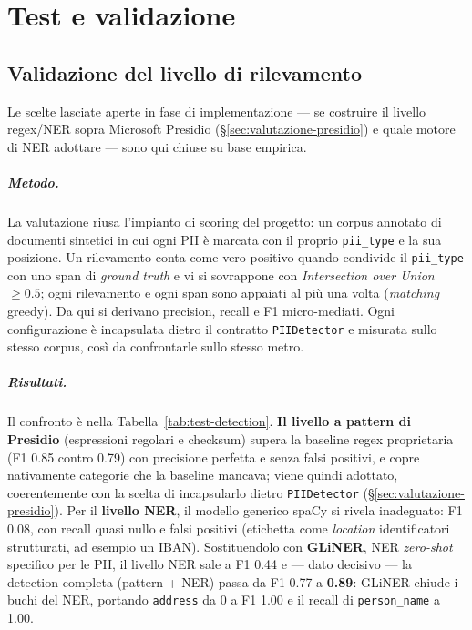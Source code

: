 \chapter{Test e validazione}
\label{cap:test}

\section{Validazione del livello di rilevamento}
\label{sec:test-detection}

Le scelte lasciate aperte in fase di implementazione --- se costruire il livello regex/NER sopra Microsoft Presidio (§\ref{sec:valutazione-presidio}) e quale motore di NER adottare --- sono qui chiuse su base empirica.

\paragraph{Metodo.} La valutazione riusa l'impianto di scoring del progetto: un corpus annotato di documenti sintetici in cui ogni PII è marcata con il proprio \texttt{pii\_type} e la sua posizione. Un rilevamento conta come vero positivo quando condivide il \texttt{pii\_type} con uno span di \textit{ground truth} e vi si sovrappone con \textit{Intersection over Union} $\geq 0.5$; ogni rilevamento e ogni span sono appaiati al più una volta (\textit{matching} greedy). Da qui si derivano precision, recall e F1 micro-mediati. Ogni configurazione è incapsulata dietro il contratto \texttt{PIIDetector} e misurata sullo stesso corpus, così da confrontarle sullo stesso metro.

\paragraph{Risultati.} Il confronto è nella Tabella~\ref{tab:test-detection}. \textbf{Il livello a pattern di Presidio} (espressioni regolari e checksum) supera la baseline regex proprietaria (F1 0.85 contro 0.79) con precisione perfetta e senza falsi positivi, e copre nativamente categorie che la baseline mancava; viene quindi adottato, coerentemente con la scelta di incapsularlo dietro \texttt{PIIDetector} (§\ref{sec:valutazione-presidio}). Per il \textbf{livello NER}, il modello generico spaCy si rivela inadeguato: F1 0.08, con recall quasi nullo e falsi positivi (etichetta come \textit{location} identificatori strutturati, ad esempio un IBAN). Sostituendolo con \textbf{GLiNER}, NER \textit{zero-shot} specifico per le PII, il livello NER sale a F1 0.44 e --- dato decisivo --- la detection completa (pattern + NER) passa da F1 0.77 a \textbf{0.89}: GLiNER chiude i buchi del NER, portando \texttt{address} da 0 a F1 1.00 e il recall di \texttt{person\_name} a 1.00.

